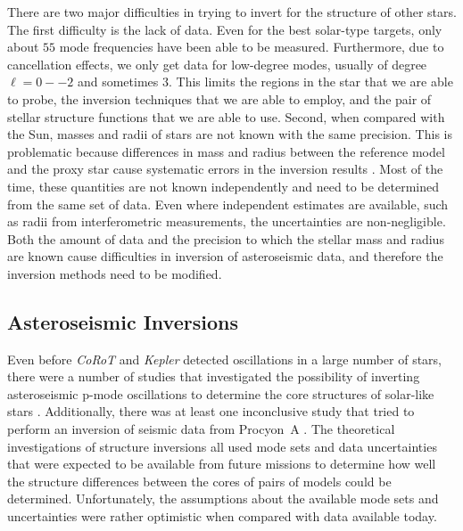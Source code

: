 There are two major difficulties in trying to invert for the structure of other stars.
The first difficulty is the lack of data. 
Even for the best solar-type targets, only about $55$ mode frequencies have been able to be measured. 
Furthermore, due to cancellation effects, we only get data for low-degree modes, usually of degree ${\ell=0--2}$ and sometimes $3$. 
This limits the regions in the star that we are able to probe, the inversion techniques that we are able to employ, and the pair of stellar structure functions that we are able to use. 
Second, when compared with the Sun, masses and radii of stars are not known with the same precision. 
This is problematic because differences in mass and radius between the reference model and the proxy star cause systematic errors in the inversion results \citep[see][]{2003Ap&SS.284..153B}. 
Most of the time, these quantities are not known independently and need to be determined from the same set of data. 
Even where independent estimates are available, such as radii from interferometric measurements, the uncertainties are non-negligible. 
Both the amount of data and the precision to which the stellar mass and radius are known cause difficulties in inversion of asteroseismic data, and therefore the inversion methods need to be modified. 



%
%
%
\subsection{Asteroseismic Inversions} 
\label{sec:asteroseismic-inversions}

Even before {\it CoRoT} and {\it Kepler} detected oscillations in a large number of stars, there were a number of studies that investigated the possibility of inverting asteroseismic p-mode oscillations to determine the core structures of solar-like stars \citep{1993ASPC...40..541G,
1998mons.proc...33G, 2001ESASP.464..411B, 2001ESASP.464..407B,
2002ESASP.485..249B, 2003Ap&SS.284..153B}. 
Additionally, there was at least one inconclusive study that tried to perform an inversion of seismic data from Procyon~A \citep{2004ESASP.559..186D}. 
The theoretical investigations of structure inversions all used mode sets and data uncertainties that were expected to be available from future missions to determine how well the structure differences between the cores of pairs of models could be determined. 
Unfortunately, the assumptions about the available mode sets and uncertainties were rather optimistic when compared with data available today. 


